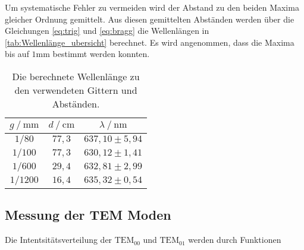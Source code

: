 Um systematische Fehler zu vermeiden wird der Abstand zu den beiden Maxima gleicher Ordnung gemittelt. 
Aus diesen gemittelten Abständen werden über die Gleichungen \eqref{eq:trig} und \eqref{eq:bragg} die Wellenlängen in \autoref{tab:Wellenlänge_ubersicht} berechnet. 
Es wird angenommen, dass die Maxima bis auf $1 \unit{\milli\meter}$ bestimmt werden konnten.

\begin{table}[H]
    \centering
    \caption{Die berechnete Wellenlänge zu den verwendeten Gittern und Abständen.}
    \label{tab:Wellenlänge_ubersicht}
    \begin{tabular}{c c c}
    \toprule
     $g \mathbin{/} \unit{\milli\meter}$ & $d \mathbin{/} \unit{\centi\meter}$ &$\lambda \mathbin{/} \unit{\nano\meter}$ \\
    \midrule
    $1/80  $   & $77,3$   & $637,10 \pm 5,94$\\
    $1/100 $   & $77,3$   & $630,12 \pm 1,41$\\
    $1/600 $   & $29,4$   & $632,81 \pm 2,99$\\
    $1/1200$   & $16,4$   & $635,32 \pm 0,54$\\
    \bottomrule
    \end{tabular}
    \end{table}

\subsection{Messung der TEM Moden}
\label{sec:TEM_moden}

Die Intentsitätsverteilung der $\text{TEM}_{00}$ und $\text{TEM}_{01}$  werden durch Funktionen 

